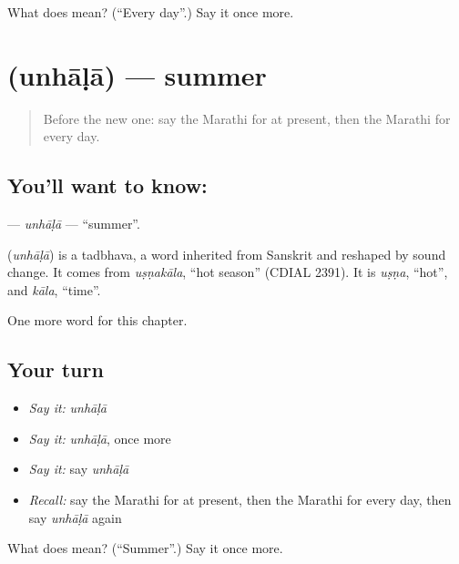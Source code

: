 \begin{tcolorbox}[breakable,colback=teal!4,colframe=teal!35!black,title={Before you move on}]
What does  mean? (\textquotedblleft{}Every day\textquotedblright{}.) Say it once more.
\end{tcolorbox}
\section[\texorpdfstring{\mr{उन्हाळा} (unhāḷā)}{उन्हाळा (unhāḷā)}]{ (unhāḷā) — summer}

\label{lesson:MR-C126-unhala}



\begin{quote}
Before the new one: say the Marathi for at present, then the Marathi for every day.
\end{quote}

\subsection*{You'll want to know: }
\textbf{} — \emph{unhāḷā} — \textquotedblleft{}summer\textquotedblright{}.

\begin{cousinweb}
\textbf{} (\emph{unhāḷā}) is a tadbhava, a word inherited from Sanskrit and reshaped by sound change. It comes from \emph{uṣṇakāla}, \textquotedblleft{}hot season\textquotedblright{} (CDIAL 2391). It is \emph{uṣṇa}, \textquotedblleft{}hot\textquotedblright{}, and \emph{kāla}, \textquotedblleft{}time\textquotedblright{}.
\end{cousinweb}

\begin{grammarlens}[title={What you've built}]
One more word for this chapter.
\end{grammarlens}

\subsection*{Your turn}
\begin{itemize}
\raggedright
  \item \emph{Say it:} \emph{unhāḷā}
  \item \emph{Say it:} \emph{unhāḷā}, once more
  \item \emph{Say it:} say \emph{unhāḷā}
  \item \emph{Recall:} say the Marathi for at present, then the Marathi for every day, then say \emph{unhāḷā} again
\end{itemize}

\begin{tcolorbox}[breakable,colback=teal!4,colframe=teal!35!black,title={Before you move on}]
What does  mean? (\textquotedblleft{}Summer\textquotedblright{}.) Say it once more.
\end{tcolorbox}
